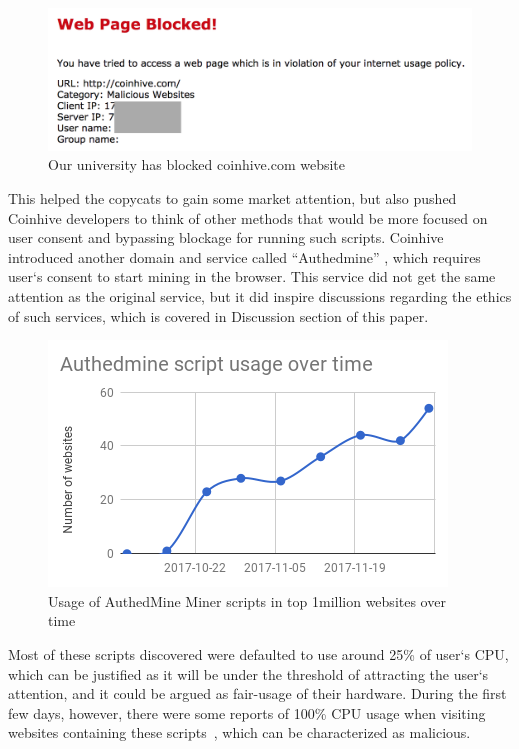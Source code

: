 \begin{figure}[t]
\centering
\includegraphics[width=\linewidth]{figures/coinhive_blocked.png}
\caption{Our university has blocked coinhive.com website}
\end{figure}


This helped the copycats to gain some market attention, but also pushed Coinhive developers to think of other methods that would be more focused on user consent and bypassing blockage for running such scripts. Coinhive introduced another domain and service called ``Authedmine'' , which requires user`s consent to start mining in the browser. This service did not get the same attention as the original service, but it did inspire discussions regarding the ethics of such services, which is covered in Discussion section of this paper. 


\begin{figure}[t]
\centering
\includegraphics[width=\linewidth]{figures/usage_of_authedmine_over_time.png}
	\caption{Usage of AuthedMine Miner scripts in top 1million websites over time}
\end{figure}


Most of these scripts discovered were defaulted to use around 25\% of user`s CPU, which can be justified as it will be under the threshold of attracting the user`s attention, and it could be argued as fair-usage of their hardware. During the first few days, however, there were some reports of 100\% CPU usage when visiting websites containing these scripts~\cite{piratesbayblog}, which can be characterized as malicious.

